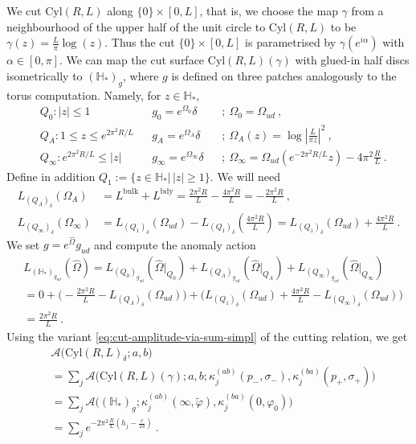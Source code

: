 \documentclass[11pt,a4paper]{article}
\numberwithin{equation}{section}
\begin{document}
We cut $\mathrm{Cyl}(R,L)$ along $\{0\} \times [0,L]$, that is, we choose the map $\gamma$ from a neighbourhood of the upper half of the unit circle to $\mathrm{Cyl}(R,L)$ to be 
$\gamma(z) = \frac{L}{\pi} \log(z)$. Thus the cut $\{0\} \times [0,L]$ is parametrised by $\gamma(e^{i \alpha})$ with $\alpha \in [0,\pi]$. We can map the cut surface $\mathrm{Cyl}(R,L)(\gamma)$ with glued-in half discs isometrically to $(\mathbb{H}_*)_{g}$, where $g$ is defined on three patches analogously to the torus computation. Namely, for $z \in \mathbb{H}_*$,
\begin{align}
    &Q_0 : |z| \le 1 &&g_0 = e^{\Omega_0} \delta &&; ~\Omega_0 = \Omega_{ud} \ ,
    \nonumber
    \\
    &Q_A : 1 \le z \le e^{2 \pi^2 R/L}  &&g_A = e^{\Omega_A}\delta &&; ~\Omega_A(z) = \log\left|\tfrac{L}{\pi z}\right|^2 \ ,
    \nonumber
    \\
    &Q_\infty :  e^{2 \pi^2 R/L} \le |z| &&g_\infty = e^{\Omega_\infty}\delta &&; ~\Omega_\infty =  \Omega_{ud}(e^{-2 \pi^2 R/L}z) - 4 \pi^2 \tfrac{R}L  \ .
\end{align}
Define in addition $Q_1 := \{ z \in \mathbb{H}_* |\, |z| \ge 1 \}$.
We will need
\begin{align}
    L_{(Q_A)_\delta}(\Omega_A)
    &= L^\text{bulk} + L^\text{bdy}
    = \tfrac{2 \pi^2 R}L - \tfrac{4 \pi^2 R}L = -\tfrac{2 \pi^2 R}L
    \ ,
    \nonumber
    \\
    L_{(Q_\infty)_\delta}(\Omega_\infty)
    &= 
    L_{(Q_1)_\delta}(\Omega_{ud})
    -
    L_{(Q_1)_\delta}(\tfrac{4 \pi^2 R}L)
    =
    L_{(Q_1)_\delta}(\Omega_{ud})
    +
    \tfrac{4 \pi^2 R}L
    \ .
\end{align}
We set $g = e^{\hat\Omega} g_{ud}$ and compute the anomaly action
\begin{align}
    &L_{(\mathbb{H}_*)_{g_{ud}}}(\hat\Omega)
    =
    L_{(Q_0)_{g_{ud}}}(\hat\Omega|_{Q_0})
    +
    L_{(Q_A)_{g_{ud}}}(\hat\Omega|_{Q_A})
    +
    L_{(Q_\infty)_{g_{ud}}}(\hat\Omega|_{Q_\infty})
    \nonumber
    \\
    &= 
    0 + 
    \Big(-\tfrac{2 \pi^2 R}L  - L_{(Q_A)_\delta}(\Omega_{ud})  \Big)
    +
    \Big(L_{(Q_1)_\delta}(\Omega_{ud})
    +
    \tfrac{4 \pi^2 R}L 
    - L_{(Q_\infty)_\delta}(\Omega_{ud}) \Big)
        \nonumber
    \\
    &= \tfrac{2 \pi^2 R}L \ .
\end{align}
Using the variant \eqref{eq:cut-amplitude-via-sum-simpl} of the cutting relation, we get
\begin{align}
    &\mathcal{A}\big(\mathrm{Cyl}(R,L)_\delta;a,b\big) 
\nonumber \\
& 
= 
\sum_j \mathcal{A}\big(\mathrm{Cyl}(R,L)(\gamma);a,b; \kappa^{(ab)}_j(p_-,\sigma_-), \kappa^{(ba)}_j(p_+,\sigma_+) \big) 
\nonumber \\
& 
= 
\sum_j \mathcal{A}\big((\mathbb{H}_*)_{g}; \kappa^{(ab)}_j(\infty,\tilde\varphi), \kappa^{(ba)}_j(0, \varphi_0) \big) 
\nonumber \\
& 
= 
\sum_j 
e^{-2 \pi^2 \frac{R}{L} (h_j- \frac{c}{24})}
 \ .
\end{align}
\end{document}
